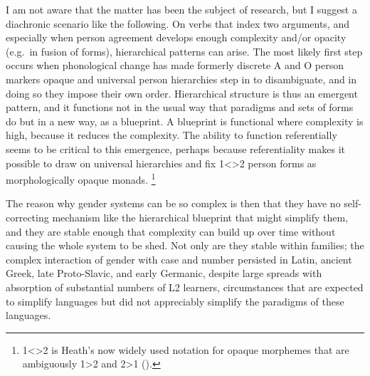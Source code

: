 \documentclass[output=collectionpaper]{langsci/langscibook}
\begin{document}
I am not aware that the matter has been the subject of research, but I suggest a diachronic scenario like the following. On verbs that index two arguments, and especially when person agreement develops enough complexity and/or opacity (e.g.\ in fusion of forms), hierarchical patterns can arise. The most likely first step occurs when phonological change has made formerly discrete A and O person markers opaque and universal person hierarchies step in to disambiguate, and in doing so they impose their own order. Hierarchical structure is thus an emergent pattern, and it functions not in the usual way that paradigms and sets of forms do but in a new way, as a blueprint. A blueprint is functional where complexity is high, because it reduces the complexity. The ability to function referentially seems to be critical to this emergence, perhaps because referentiality makes it possible to draw on universal hierarchies and fix 1<>2 person forms as morphologically opaque monads.%
\footnote{%
1<>2 is Heath's now widely used notation for opaque morphemes that are ambiguously 1>2 and 2>1 (\citealt*{Heath1998}).
}%

The reason why gender systems can be so complex is then that they have no self-correcting mechanism like the hierarchical blueprint that might simplify them, and they are stable enough that complexity can build up over time without causing the whole system to be shed. Not only are they stable within families; the complex interaction of gender with case and number persisted in Latin, ancient Greek, late Proto-Slavic, and early Germanic, despite large spreads with absorption of substantial numbers of L2 learners, circumstances that are expected to simplify languages but did not appreciably simplify the paradigms of these languages.
\end{document}
